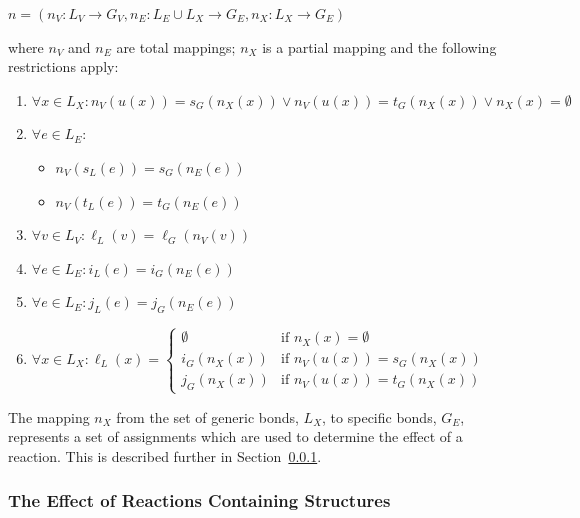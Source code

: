\documentclass{cekarticle}
\begin{document}
$n = (n_{V} : L_{V} \rightarrow G_{V}, n_{E} : L_{E} \cup L_{X}
\rightarrow G_{E}, n_{X} : L_{X} \rightarrow G_{E})$

where $n_{V}$ and $n_{E}$ are total mappings; $n_{X}$ is a partial
mapping and the following restrictions apply:

\begin{enumerate}

\item $\forall x \in L_{X} : n_{V}(u(x)) = s_{G}(n_{X}(x)) \vee
n_{V}(u(x)) = t_{G}(n_{X}(x)) \vee n_{X}(x) = \emptyset$

\item $\forall e \in L_{E} : $
    \begin{itemize}
    \item $n_{V}(s_{L}(e))= s_{G}(n_{E}(e))$
    \item $n_{V}(t_{L}(e))= t_{G}(n_{E}(e))$
    \end{itemize}
\item $\forall v \in L_{V} : \ell_{L}(v) = \ell_{G}(n_{V}(v))$

\item $\forall e \in L_{E} : i_{L}(e) = i_{G}(n_{E}(e))$

\item $\forall e \in L_{E} : j_{L}(e) = j_{G}(n_{E}(e))$

\item $ \forall x \in L_{X} : \ell_{L}(x) = \left\{
\begin{array}{ll}
\emptyset & \mbox{if $n_{X}(x) = \emptyset $}\\
i_{G}(n_{X}(x)) & \mbox{if $n_{V}(u(x)) = s_{G}(n_{X}(x))$}\\
j_{G}(n_{X}(x)) & \mbox{if $n_{V}(u(x)) = t_{G}(n_{X}(x))$}
\end{array} \right. $
\end{enumerate}

The mapping $n_{X}$ from the set of generic bonds, $L_{X}$, to
specific bonds, $G_{E}$, represents a set of assignments which are
used to determine the effect of a reaction. This is described
further in Section~\ref{sec:effect-of-reactions}.

\subsubsection{The Effect of Reactions Containing  Structures}
\label{sec:effect-of-reactions}
\end{document}
